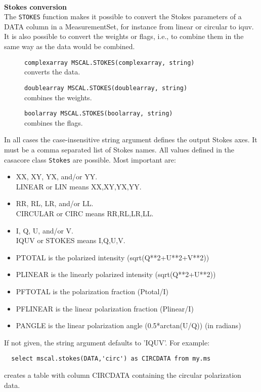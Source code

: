 \paragraph*{}
{\bf Stokes conversion}
\\The \texttt{STOKES} function makes it possible to convert the Stokes
parameters of a DATA column in a MeasurementSet, for instance from
linear or circular to iquv. It is also possible to convert the weights
or flags, i.e., to combine them in the same way as the data would be combined.
\begin{description}
 \item[] \texttt{complexarray MSCAL.STOKES(complexarray, string)}\\
   converts the data.
 \item[] \texttt{doublearray MSCAL.STOKES(doublearray, string)}\\
   combines the weights.
 \item[] \texttt{boolarray MSCAL.STOKES(boolarray, string)}\\
   combines the flags.
\end{description}
In all cases the case-insensitive string argument defines the output Stokes
axes. It must be a comma separated list of Stokes names. All values
defined in the casacore class \texttt{Stokes} are possible. Most
important are:
\begin{itemize}
 \item XX, XY, YX, and/or YY. \\LINEAR or LIN means XX,XY,YX,YY.
 \item RR, RL, LR, and/or LL. \\CIRCULAR or CIRC means RR,RL,LR,LL.
 \item I, Q, U, and/or V. \\IQUV or STOKES means I,Q,U,V.
 \item PTOTAL is the polarized intensity (sqrt(Q**2+U**2+V**2))
 \item PLINEAR is the linearly polarized intensity (sqrt(Q**2+U**2))
 \item PFTOTAL is the polarization fraction (Ptotal/I)
 \item PFLINEAR is the linear polarization fraction (Plinear/I)
 \item PANGLE is the linear polarization angle (0.5*arctan(U/Q)) (in radians)
\end{itemize}
If not given, the string argument defaults to 'IQUV'.
For example:
\begin{verbatim}
  select mscal.stokes(DATA,'circ') as CIRCDATA from my.ms
\end{verbatim}
creates a table with column CIRCDATA containing the circular
polarization data.

